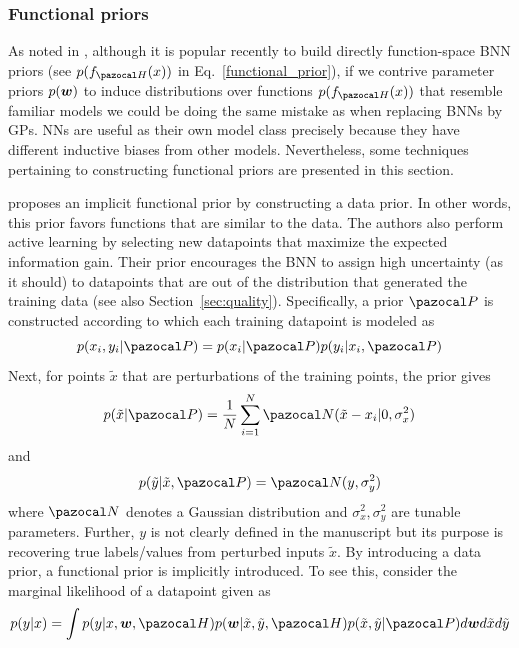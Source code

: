 \subsubsection{Functional priors}\label{sec:functional}
As noted in \textcite{wilson2020bayesian}, although it is popular recently to build directly function-space BNN priors (see $p(f_{\cH}(x))$ in Eq.~\eqref{functional_prior}), if we contrive parameter priors $p(\boldsymbol{w})$ to induce distributions over functions $p(f_{\cH}(x))$ that resemble familiar models we could be doing the same mistake as when replacing BNNs by GPs. 
NNs are useful as their own model class precisely because they have different inductive biases from other models.
Nevertheless, some techniques pertaining to constructing functional priors are presented in this section.

\textcite{hafner2018noise} proposes an implicit functional prior by constructing a data prior.
In other words, this prior favors functions that are similar to the data. 
The authors also perform active learning by selecting new datapoints that maximize the expected information gain. 
Their prior encourages the BNN to assign high uncertainty (as it should) to datapoints that are out of the distribution that generated the training data (see also Section~\ref{sec:quality}).
Specifically, a prior $\cP$ is constructed according to which each training datapoint is modeled as
\begin{equation}
	p(x_i,y_i|\cP) = p(x_i|\cP)p(y_i|x_i,\cP)
\end{equation}
Next, for points $\tilde{x}$ that are perturbations of the training points, the prior gives
\begin{equation}
p(\tilde{x}|\cP) = \frac{1}{N}\sum_{i=1}^{N}\cN(\tilde{x}-x_i|0,\sigma_x^2)
\end{equation}
and 
\begin{equation}
p(\tilde{y}|\tilde{x},\cP) = \cN(y,\sigma_y^2)
\end{equation}
where $\cN$ denotes a Gaussian distribution and $\sigma_x^2, \sigma_y^2$ are tunable parameters.
Further, $y$ is not clearly defined in the manuscript but its purpose is recovering true labels/values from perturbed inputs $\tilde{x}$.
By introducing a data prior, a functional prior is implicitly introduced. 
To see this, consider the marginal likelihood of a datapoint given as
\begin{equation}
	p(y|x) = \int p(y|x,\bw,\cH)p(\bw|\tilde{x},\tilde{y},\cH)p(\tilde{x},\tilde{y}|\cP)d\bw d\tilde{x}d\tilde{y}
\end{equation}
